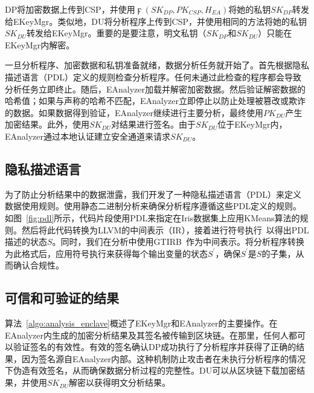 DP将加密数据上传到CSP，并使用$\digamma(SK_{DP}, PK_{CSP}, H_{EA})$将她的私钥$SK_{DP}$转发给EKeyMgr。类似地，DU将分析程序上传到CSP，并使用相同的方法将她的私钥$SK_{DU}$转发给EKeyMgr。重要的是要注意，明文私钥（$SK_{DP}$和$SK_{DU}$）只能在EKeyMgr内解密。

一旦分析程序、加密数据和私钥准备就绪，数据分析任务就开始了。首先根据隐私描述语言（PDL）定义的规则检查分析程序。任何未通过此检查的程序都会导致分析任务立即终止。随后，EAnalyzer加载并解密加密数据。然后验证解密数据的哈希值；如果与声称的哈希不匹配，EAnalyzer立即停止以防止处理被篡改或欺诈的数据。如果数据得到验证，EAnalyzer继续进行主要分析，最终使用$PK_{DU}$产生加密结果。此外，使用$SK_{DU}$对结果进行签名。由于$SK_{DU}$位于EKeyMgr内，EAnalyzer通过本地认证建立安全通道来请求$SK_{DU}$。


\subsection{隐私描述语言}
为了防止分析结果中的数据泄露，我们开发了一种隐私描述语言（PDL）来定义数据使用规则。使用静态二进制分析来确保分析程序遵循这些PDL定义的规则。如图~\ref{fig:pdl}所示，代码片段使用PDL来指定在Iris数据集上应用KMeans算法的规则。然后将此代码转换为LLVM的中间表示（IR），接着进行符号执行~\cite{king1976symbolic,baldoni2018survey}以得出PDL描述的状态$S$。同时，我们在分析中使用GTIRB~\cite{schulte2019gtirb}作为中间表示。将分析程序转换为此格式后，应用符号执行来获得每个输出变量的状态$S^{\prime}$，确保$S^{\prime}$是$S$的子集，从而确认合规性。

\subsection{可信和可验证的结果}
算法~\ref{algo:analysis_enclave}概述了EKeyMgr和EAnalyzer的主要操作。在EAnalyzer内生成的加密分析结果及其签名被传输到区块链。在那里，任何人都可以验证签名的有效性。有效的签名确认DP成功执行了分析程序并获得了正确的结果，因为签名源自EAnalyzer内部。这种机制防止攻击者在未执行分析程序的情况下伪造有效签名，从而确保数据分析过程的完整性。DU可以从区块链下载加密结果，并使用$SK_{DU}$解密以获得明文分析结果。


